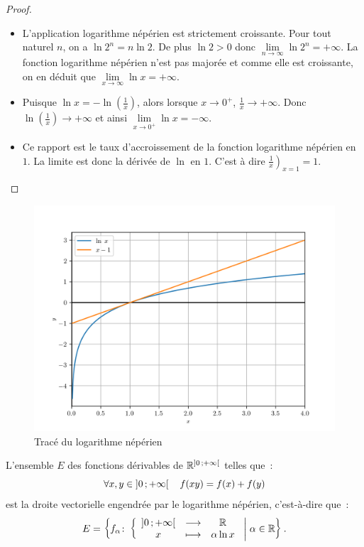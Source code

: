 \begin{proof}
    \begin{itemize}
        \item L'application logarithme népérien est strictement croissante. 
            Pour tout naturel \(n\), on a \(\ln 2^n = n \ln 2\). De plus 
            \(\ln 2 >0\) donc \(\lim\limits_{n \to \infty} \ln 2^n = + 
            \infty\). La fonction logarithme népérien n'est pas majorée et 
            comme elle est croissante, on en déduit que \(\lim\limits_{x \to 
            \infty} \ln x = +\infty\).
        \item Puisque \(\ln x = - \ln\left(\frac{1}{x}\right)\), alors 
            lorsque \(x\to 0^+\), \(\frac{1}{x} \to + \infty\). Donc \(\ln 
            \left(\frac{1}{x}\right) \to +\infty\) et ainsi \(\lim\limits_{x 
            \to 0^+} \ln x = - \infty\).
        \item Ce rapport est le taux d'accroissement de la fonction 
            logarithme népérien en \(1\). La limite est donc la dérivée de 
            \(\ln\) en \(1\).  C'est à dire 
            \(\left.\frac{1}{x}\right)_{x=1}=1\).
    \end{itemize}
\end{proof}
\begin{figure}
    \centering
    \includegraphics[scale=0.8]{lognep.png}
    \caption{Tracé du logarithme népérien}
    \label{fig:traceln}
\end{figure}
\begin{theo}
    L'ensemble \(E\) des fonctions dérivables de \(\mathbb{R}^{\left] 0 \, ;  +\infty \right[}\) 
    telles que~:
    \begin{equation}
        \label{eq:fonclog}
        \forall x, y \in \left] 0 \, ;  +\infty \right[ \quad f(xy)=f(x)+f(y)
    \end{equation}
    est la droite vectorielle engendrée par le logarithme népérien, 
    c'est-à-dire que~:
    \begin{equation}
        E=\left\{f_{\alpha}\colon \left\{\begin{array}{ccc} \left] 0 \, ;  +\infty \right[ & \longrightarrow &\mathbb{R}\\ x & \longmapsto & \alpha \ln 
        x \end{array} \right.\mathrel{}\middle|\mathrel{}\alpha \in \mathbb{R}\right\}.
    \end{equation}
\end{theo}
